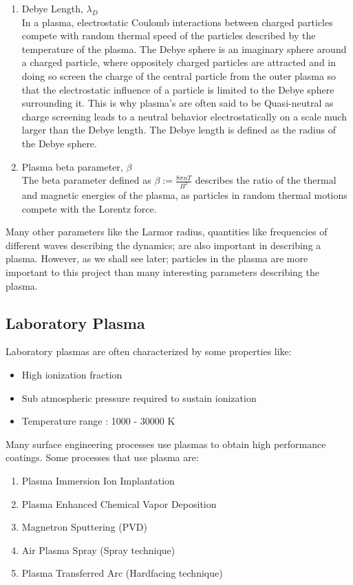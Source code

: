 \documentclass[12pt]{article}
\begin{document}
\begin{enumerate}
		\item Debye Length, $\lambda_{D}$ \\
		In a plasma, electrostatic Coulomb interactions between charged particles compete with random thermal speed of the particles described by the temperature of the plasma. The Debye sphere is an imaginary sphere around a charged particle, where oppositely charged particles are attracted and in doing so screen the charge of the central particle from the outer plasma so that the electrostatic influence of a particle is limited to the Debye sphere surrounding it. This is why plasma's are often said to be Quasi-neutral as charge screening leads to a neutral behavior electrostatically on a scale much larger than the Debye length. The Debye length is defined as the radius of the Debye sphere.
		
		\item Plasma beta parameter, $\beta$ \\
		The beta parameter defined as $\beta := \frac{\displaystyle 8 \pi n T}{\displaystyle B^{2}}$ describes the ratio of the thermal and magnetic energies of the plasma, as particles in random thermal motions compete with the Lorentz force.
		
	\end{enumerate} 
		Many other parameters like the Larmor radius, quantities like frequencies of different waves describing the dynamics; are also important in describing a plasma. However, as we shall see later; particles in the plasma are more important to this project than many interesting parameters describing the plasma.
	
	\subsection{Laboratory Plasma}
	Laboratory plasmas are often characterized by some properties like:
	\begin{itemize}[itemsep=0cm]
		\item High ionization fraction
		\item Sub atmospheric pressure required to sustain ionization
		\item Temperature range : 1000 - 30000 K
	\end{itemize}

	\noindent Many surface engineering processes use plasmas to obtain high performance coatings. Some processes that use plasma are:
	\begin{enumerate}[itemsep=0cm]
		\item Plasma Immersion Ion Implantation
		\item Plasma Enhanced Chemical Vapor Deposition
		\item Magnetron Sputtering (PVD)
		\item Air Plasma Spray (Spray technique)
		\item Plasma Transferred Arc (Hardfacing technique)
	\end{enumerate}
	
\end{document}

